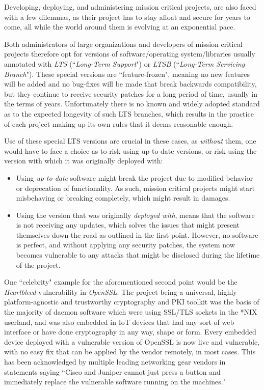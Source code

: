 \documentclass[a4paper,12pt]{article}
\begin{document}
	Developing, deploying, and administering mission critical projects, are also faced with a few dilemmas, as their project has to stay afloat and secure for years to come, all while the world around them is evolving at an exponential pace.
	
	Both administrators of large organizations and developers of mission critical projects therefore opt for versions of software/operating system/libraries usually annotated with \textit{LTS} (``\textit{Long-Term Support}") or \textit{LTSB} (``\textit{Long-Term Servicing Branch}"). These special versions are ``feature-frozen", meaning no new features will be added and no bug-fixes will be made that break backwards compatibility, but they continue to receive security patches for a long period of time, usually in the terms of years. Unfortunately there is no known and widely adopted standard as to the expected longevity of such LTS branches, which results in the practice of each project making up its own rules that it deems reasonable enough.
	
	Use of these special LTS versions are crucial in these cases, as \textit{without} them, one would have to face a choice as to risk using up-to-date versions, or risk using the version with which it was originally deployed with:
	
	\begin{itemize}
		\item Using \textit{up-to-date} software might break the project due to modified behavior or deprecation of functionality. As such, mission critical projects might start misbehaving or breaking completely, which might result in damages.
		\item Using the version that was originally \textit{deployed with}, means that the software is not receiving any updates, which solves the issues that might present themselves down the road as outlined in the first point. However, no software is perfect, and without applying any security patches, the system now becomes vulnerable to any attacks that might be disclosed during the lifetime of the project.
	\end{itemize}
	
	One ``celebrity" example for the aforementioned second point would be the \textit{Heartbleed} vulnerability in \textit{OpenSSL}. The project being a universal, highly platform-agnostic and trustworthy cryptography and PKI toolkit was the basis of the majority of daemon software which were using SSL/TLS sockets in the *NIX userland, and was also embedded in IoT devices that had any sort of web interface or have done cryptography in any way, shape or form. Every embedded device deployed with a vulnerable version of OpenSSL is now live and vulnerable, with no easy fix that can be applied by the vendor remotely, in most cases. This has been acknowledged by multiple leading networking gear vendors in statements saying ``Cisco and Juniper cannot just press a button and immediately replace the vulnerable software running on the machines."\cite{jpaglier14}
	
\end{document}
